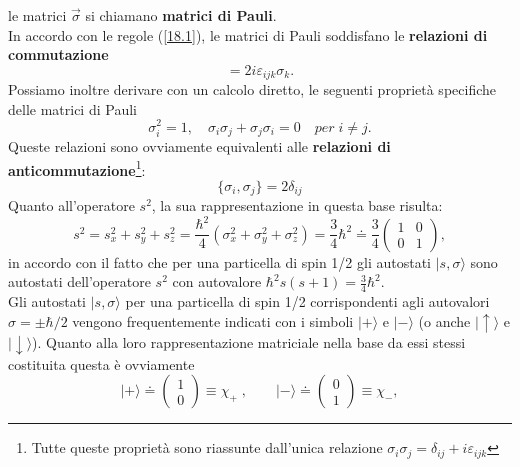 \documentclass[a4paper,12pt,oneside]{book}
\begin{document}
le matrici $\vec{\sigma}$ si chiamano \textbf{matrici di Pauli}.\\
In accordo con le regole (\ref{18.1}), le matrici di Pauli soddisfano le \textbf{relazioni di commutazione}
\begin{equation}
[\sigma_{i}, \sigma_{j}]=2i\varepsilon_{ijk}\sigma_{k} .
\end{equation}
Possiamo inoltre derivare con un calcolo diretto, le seguenti proprietà specifiche delle matrici di Pauli
\begin{equation}
\sigma_{i}^{2}=1, \quad \sigma_{i}\sigma_{j}+\sigma_{j}\sigma_{i}=0 \quad per \; i \neq j .
\end{equation}
Queste relazioni sono ovviamente equivalenti alle \textbf{relazioni di anticommutazione}\footnote{Tutte queste proprietà sono riassunte dall'unica relazione $\sigma_{i}\sigma_{j}=\delta_{ij}+i\varepsilon_{ijk}$}:
\begin{equation}
\lbrace\sigma_{i}, \sigma_{j}\rbrace=2\delta_{ij}
\end{equation}
Quanto all'operatore $s^{2}$, la sua rappresentazione in questa base risulta:
\begin{equation}
s^{2}=s_{x}^{2}+s_{y}^{2}+s_{z}^{2}=\frac{\hbar^{2}}{4}(\sigma_{x}^{2}+\sigma_{y}^{2}+\sigma_{z}^{2})=
\frac{3}{4}\hbar^{2}\doteq\frac{3}{4}\begin{pmatrix}
1 & 0 \\
0 & 1
\end{pmatrix} ,
\end{equation} 
in accordo con il fatto che per una particella di spin 1/2 gli autostati $\vert s, \sigma\rangle$ sono autostati  dell'operatore $s^{2}$ con autovalore $\hbar^{2}s(s+1)=\frac{3}{4}\hbar^{2}$.\\
Gli autostati $\vert s, \sigma\rangle$ per una particella di spin 1/2 corrispondenti agli autovalori $\sigma=\pm\hbar/2$ vengono frequentemente indicati con i simboli $\vert +\rangle$ e $\vert -\rangle$ (o anche $\vert \uparrow \rangle$ e $\vert \downarrow \rangle$). Quanto alla loro rappresentazione matriciale nella base da essi stessi costituita questa è ovviamente
\begin{equation}
\vert +\rangle\doteq\begin{pmatrix}
1 \\
0
\end{pmatrix}\equiv \chi_{+}\;, \qquad \vert - \rangle\doteq\begin{pmatrix}
0 \\
1
\end{pmatrix}\equiv \chi_{-} ,
\end{equation}
\end{document}
